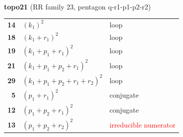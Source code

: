 \documentclass[10pt]{article}
\begin{document}
\begin{minipage}[t]{0.48\textwidth}
{}\\[2mm]\textbf{topo21} (RR family 23, pentagon q-r1-p1-p2-r2)\\[2pt]{\footnotesize\begin{tabular}{@{}r@{\ \ }l@{\ \ }l@{}}\textbf{14} & $(k_1)^2$ & loop\\
\textbf{18} & $(k_1+r_1)^2$ & loop\\
\textbf{19} & $(k_1+p_1+r_1)^2$ & loop\\
\textbf{21} & $(k_1+p_1+p_2+r_1)^2$ & loop\\
\textbf{29} & $(k_1+p_1+p_2+r_1+r_2)^2$ & loop\\
\textbf{5} & $(p_1+r_1)^2$ & conjugate\\
\textbf{12} & $(p_1+p_2+r_1)^2$ & conjugate\\
\textbf{13} & $(p_1+p_2+r_2)^2$ & \textcolor{red}{irreducible numerator}\\\end{tabular}}\end{minipage}\hfill%
\end{document}
